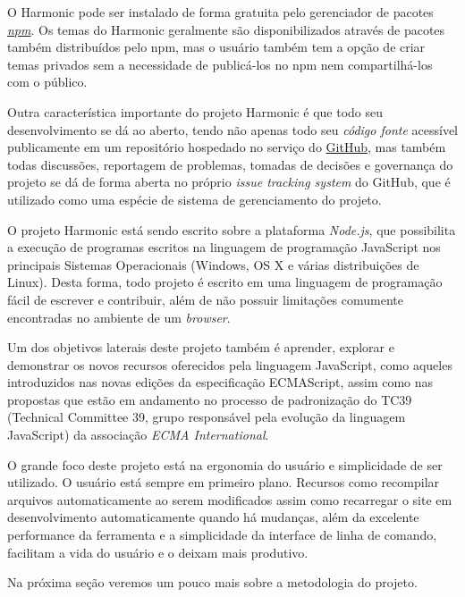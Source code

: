 \documentclass[ppginf, pep]{esinucpel}
\begin{document}
O Harmonic pode ser instalado de forma gratuita pelo gerenciador de pacotes \href{https://www.npmjs.com/}{\emph{npm}}. Os temas do Harmonic geralmente são disponibilizados através de pacotes também distribuídos pelo npm, mas o usuário também tem a opção de criar temas privados sem a necessidade de publicá-los no npm nem compartilhá-los com o público.

Outra característica importante do projeto Harmonic é que todo seu desenvolvimento se dá ao aberto, tendo não apenas todo seu \emph{código fonte} acessível publicamente em um repositório hospedado no serviço do \href{https://github.com/}{GitHub}, mas também todas discussões, reportagem de problemas, tomadas de decisões e governança do projeto se dá de forma aberta no próprio \textit{issue tracking system} do GitHub, que é utilizado como uma espécie de sistema de gerenciamento do projeto.

O projeto Harmonic está sendo escrito sobre a plataforma \emph{Node.js}, que possibilita a execução de programas escritos na linguagem de programação JavaScript nos principais Sistemas Operacionais (Windows, OS X e várias distribuições de Linux). Desta forma, todo projeto é escrito em uma linguagem de programação fácil de escrever e contribuir, além de não possuir limitações comumente encontradas no ambiente de um \textit{browser}.

Um dos objetivos laterais deste projeto também é aprender, explorar e demonstrar os novos recursos oferecidos pela linguagem JavaScript, como aqueles introduzidos nas novas edições da especificação ECMAScript, assim como nas propostas que estão em andamento no processo de padronização do TC39 (Technical Committee 39, grupo responsável pela evolução da linguagem JavaScript) da associação \textit{ECMA International}. %

O grande foco deste projeto está na ergonomia do usuário e simplicidade de ser utilizado. O usuário está sempre em primeiro plano. Recursos como recompilar arquivos automaticamente ao serem modificados assim como recarregar o site em desenvolvimento automaticamente quando há mudanças, além da excelente performance da ferramenta e a simplicidade da interface de linha de comando, facilitam a vida do usuário e o deixam mais produtivo.

Na próxima seção veremos um pouco mais sobre a metodologia do projeto. %

\end{document}
